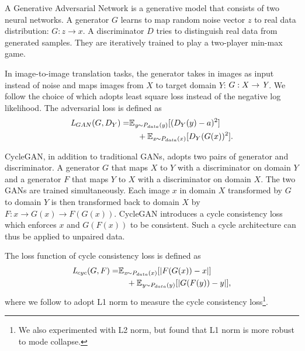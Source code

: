 \documentclass[letterpaper]{article} %
\begin{document}
	A Generative Adversarial Network is a generative model that consists of two neural networks. A generator $G$ learns to map random noise vector $z$ to real data distribution: $ G : z \rightarrow x $. A discriminator $D$ tries to distinguish real data from generated samples. They are iteratively trained to play a two-player min-max game. 
	
	In image-to-image translation tasks, the generator takes in images as input instead of noise and maps images from $X$ to target domain $Y$: $ G : X \rightarrow \emph{Y} $. We follow the choice of \cite{zhu2017unpaired} which adopts least square loss instead of the negative log likelihood. The adversarial loss is defined as
	\begin{align}
	\emph{L}_{GAN}(G,D_Y) = &\mathbb{E}_{\emph{y} \sim P_{data}(y) }[(D_Y(y)-a)^2]  \nonumber\\ 
	&~~~ +\mathbb{E}_{\emph{x} \sim P_{data}(x) }[D_Y(G(x))^2].
	\end{align}
	
	CycleGAN, in addition to traditional GANs, adopts two pairs of generator and discriminator. A generator $G$ that maps $X$ to $Y$ with a discriminator on domain $Y$ and a generator $F$ that maps $Y$ to $X$ with a discriminator on domain $X$. The two GANs are trained simultaneously. Each image $x$ in domain $X$ transformed by $G$ to domain $Y$ is then transformed back to domain $X$ by $F: x \rightarrow G(x) \rightarrow F(G(x))$. CycleGAN introduces a cycle consistency loss which enforces $x$ and $G(F(x))$ to be consistent. Such a cycle architecture can thus be applied to unpaired data.
	
	The loss function of cycle consistency loss is defined as
	\begin{align} \label{org_cycle_loss}
	\emph{L}_{cyc}(G,F)=&\mathbb{E}_{\emph{x} \sim P_{data}(x)}[\lvert F(G(x))-x\rvert] \nonumber\\ 
	&~~~ +\mathbb{E}_{\emph{y} \sim P_{data}(y)}[\lvert G(F(y))-y \rvert],
	\end{align} 
	where we follow \cite{zhu2017unpaired,yi2017dualgan} to adopt L1 norm to measure the cycle consistency loss\footnote{We also experimented with L2 norm, but found that L1 norm is more robust to mode collapse.}. 
	
\end{document}
